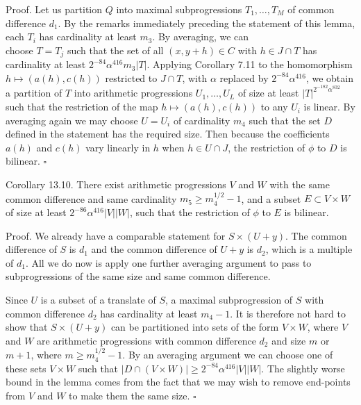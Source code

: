 \documentclass[10pt]{article}
\begin{document}
Proof. Let us partition $Q$ into maximal subprogressions $T_{1}, \ldots, T_{M}$ of common difference $d_{1}$. By the remarks immediately preceding the statement of this lemma, each $T_{i}$ has cardinality at least $m_{3}$. By averaging, we can\\
choose $T=T_{j}$ such that the set of all $(x, y+h) \in C$ with $h \in J \cap T$ has cardinality at least $2^{-84} \alpha^{416} m_{3}|T|$. Applying Corollary 7.11 to the homomorphism $h \mapsto(a(h), c(h))$ restricted to $J \cap T$, with $\alpha$ replaced by $2^{-84} \alpha^{416}$, we obtain a partition of $T$ into arithmetic progressions $U_{1}, \ldots, U_{L}$ of size at least $|T|^{2^{-182} \alpha^{832}}$ such that the restriction of the map $h \mapsto(a(h), c(h))$ to any $U_{i}$ is linear. By averaging again we may choose $U=U_{i}$ of cardinality $m_{4}$ such that the set $D$ defined in the statement has the required size. Then because the coefficients $a(h)$ and $c(h)$ vary linearly in $h$ when $h \in U \cap J$, the restriction of $\phi$ to $D$ is bilinear. \(\square\)

Corollary 13.10. There exist arithmetic progressions $V$ and $W$ with the same common difference and same cardinality $m_{5} \geqslant m_{4}^{1 / 2}-1$, and a subset $E \subset V \times W$ of size at least $2^{-86} \alpha^{416}|V||W|$, such that the restriction of $\phi$ to $E$ is bilinear.

Proof. We already have a comparable statement for $S \times(U+y)$. The common difference of $S$ is $d_{1}$ and the common difference of $U+y$ is $d_{2}$, which is a multiple of $d_{1}$. All we do now is apply one further averaging argument to pass to subprogressions of the same size and same common difference.

Since $U$ is a subset of a translate of $S$, a maximal subprogression of $S$ with common difference $d_{2}$ has cardinality at least $m_{4}-1$. It is therefore not hard to show that $S \times(U+y)$ can be partitioned into sets of the form $V \times W$, where $V$ and $W$ are arithmetic progressions with common difference $d_{2}$ and size $m$ or $m+1$, where $m \geqslant m_{4}^{1 / 2}-1$. By an averaging argument we can choose one of these sets $V \times W$ such that $|D \cap(V \times W)| \geqslant 2^{-84} \alpha^{416}|V||W|$. The slightly worse bound in the lemma comes from the fact that we may wish to remove end-points from $V$ and $W$ to make them the same size. \(\square\)
\end{document}
